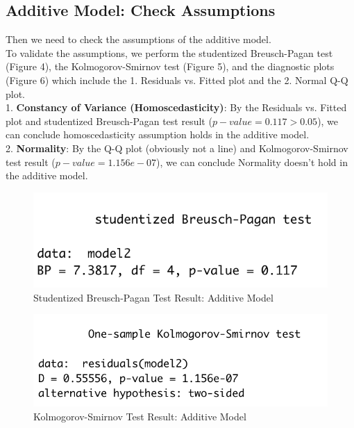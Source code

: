 \documentclass[11pt,a4paper]{article}
\begin{document}
\subsection{Additive Model: Check Assumptions}
Then we need to check the assumptions of the additive model.\\
To validate the assumptions, we perform the studentized Breusch-Pagan test (Figure 4), the Kolmogorov-Smirnov test (Figure 5), and the diagnostic plots (Figure 6) which include the 1. Residuals vs. Fitted plot and the 2. Normal Q-Q plot.\\
1. \textbf{Constancy of Variance (Homoscedasticity)}: By the Residuals vs. Fitted plot and studentized Breusch-Pagan test result ($p-value=0.117>0.05$), we can conclude homoscedasticity assumption holds in the additive model.\\
2. \textbf{Normality}: By the Q-Q plot (obviously not a line) and Kolmogorov-Smirnov test result ($p-value=1.156e-07$), we can conclude Normality doesn't hold in the additive model.
\begin{figure}[htb]
    \centering
    \includegraphics[scale=1]{BP1}
    \caption{Studentized Breusch-Pagan Test Result: Additive Model}
    \label{}
\end{figure}
\begin{figure}[htb]
    \centering
    \includegraphics[scale=1]{KS1}
    \caption{Kolmogorov-Smirnov Test Result: Additive Model}
    \label{}
\end{figure}
\end{document}
